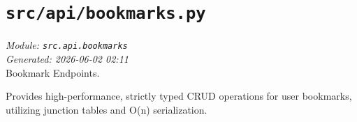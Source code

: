
\section{\texttt{src/api/bookmarks.py}}
\textit{Module: \texttt{src.api.bookmarks}} \\
\textit{Generated: 2026-06-02 02:11} \\

Bookmark Endpoints.

Provides high-performance, strictly typed CRUD operations for user
bookmarks, utilizing junction tables and O(n) serialization.
